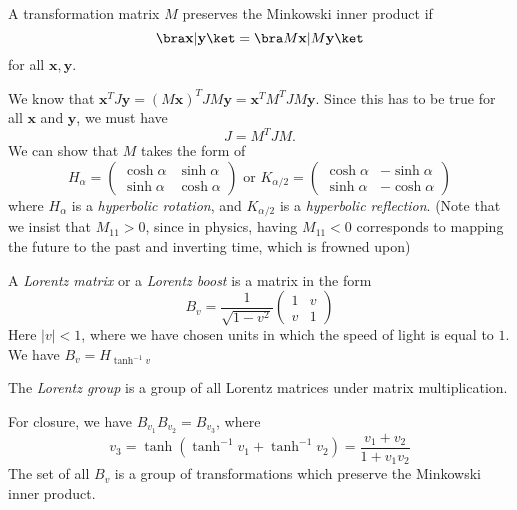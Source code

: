 \documentclass[a4paper]{article}
\begin{document}
\begin{defi}
  A transformation matrix $M$ preserves the Minkowski inner product if
  \[
    \bra \mathbf{x}|\mathbf{y}\ket = \bra M\mathbf{x} | M\mathbf{y}\ket
  \]
  for all $\mathbf{x}, \mathbf{y}$.
\end{defi}

We know that $\mathbf{x}^TJ\mathbf{y} = (M\mathbf{x})^TJM\mathbf{y} = \mathbf{x}^T M^TJM\mathbf{y}$. Since this has to be true for all $\mathbf{x}$ and $\mathbf{y}$, we must have
\[
  J = M^TJM.
\]
We can show that $M$ takes the form of
\[
  H_\alpha = \begin{pmatrix}
    \cosh \alpha & \sinh \alpha\\
    \sinh \alpha & \cosh \alpha
  \end{pmatrix}\text{ or } K_{\alpha/2} = 
  \begin{pmatrix}
    \cosh\alpha & -\sinh\alpha\\
    \sinh\alpha & -\cosh\alpha
  \end{pmatrix}
\]
where $H_\alpha$ is a \emph{hyperbolic rotation}, and $K_{\alpha/2}$ is a \emph{hyperbolic reflection}. (Note that we insist that $M_{11} > 0$, since in physics, having $M_{11} < 0$ corresponds to mapping the future to the past and inverting time, which is frowned upon)

\begin{defi}
  A \emph{Lorentz matrix} or a \emph{Lorentz boost} is a matrix in the form 
  \[
    B_v = \frac{1}{\sqrt{1 - v^2}}
    \begin{pmatrix}
      1 & v\\
      v & 1
    \end{pmatrix}
  \]
  Here $|v| < 1$, where we have chosen units in which the speed of light is equal to $1$. We have $B_v = H_{\tanh^{-1}v}$
\end{defi}

\begin{defi}
  The \emph{Lorentz group} is a group of all Lorentz matrices under matrix multiplication.
\end{defi}
\note For closure, we have $B_{v_1}B_{v_2} = B_{v_3}$, where
\[
  v_3 = \tanh(\tanh^{-1} v_1 + \tanh^{-1} v_2) = \frac{v_1 + v_2}{1 + v_1v_2}
\]
The set of all $B_v$ is a group of transformations which preserve the Minkowski inner product.
\end{document}
